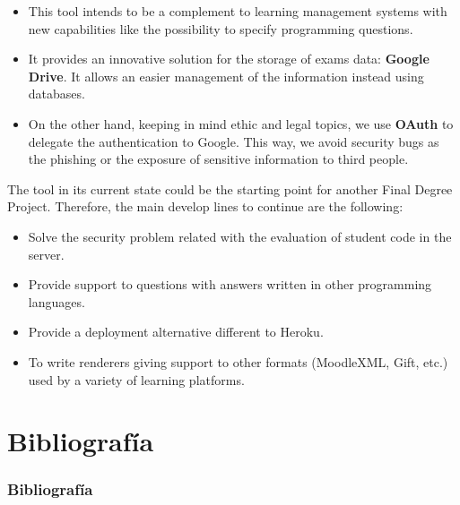 \documentclass{beamer}
\begin{document}
\begin{frame}[allowframebreaks]
  \begin{itemize}
    \item This tool intends to be a complement to learning management systems with new capabilities like the possibility to specify 
    programming questions.
    \item It provides an innovative solution for the storage of exams data: {\bfseries Google Drive}.
    It allows an easier management of the information instead using databases.
    \item On the other hand, keeping in mind ethic and legal topics, we use {\bfseries OAuth} to delegate the authentication to Google. 
    This way, we avoid security bugs as the phishing or the exposure of sensitive information to third people.
  \end{itemize}
  \framebreak
  
  The tool in its current state could be the starting point for another Final Degree Project.
  Therefore, the main develop lines to continue are the following:
  \begin{itemize}
    \item Solve the security problem related with the evaluation of student code in the server.
    \item Provide support to questions with answers written in other programming languages.
    \item Provide a deployment alternative different to Heroku.
    \item To write renderers giving support to other formats (MoodleXML, Gift, etc.) used by a variety of learning platforms.
  \end{itemize}
\end{frame}


\section{Bibliografía}
\begin{frame}[allowframebreaks]
  \frametitle{Bibliografía}
  
  
  \nocite{*}
\end{frame}
\end{document}
